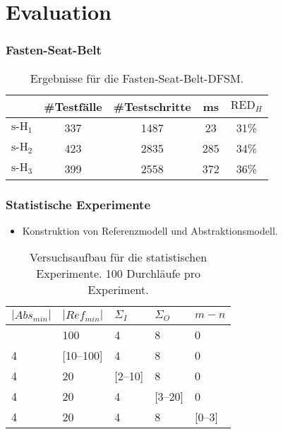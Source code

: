 \section{Evaluation}

\begin{frame}
  \frametitle{Fasten-Seat-Belt}
  \begin{table}[]
    \caption{Ergebnisse für die \glqq Fasten-Seat-Belt\grqq-DFSM.}
    \label{tab:fsbrtsx}
    \centering
    \begin{tabular}{|ccccc|}
    \hline
          & \#Testfälle & \#Testschritte & ms & $\text{RED}_H$\\ \hline\hline
        $\text{s-H}_1$ & 337         & 1487    &    23   &  31\% \\ \hline
    $\text{s-H}_2$ & 423         & 2835    &    285  & 34\%  \\ \hline
    $\text{s-H}_3$ & 399         & 2558    &    372   &  36\% \\ \hline
    \end{tabular}
\end{table}
\end{frame} 

\begin{frame}
  \frametitle{Statistische Experimente}
  \begin{itemize}
    \item Konstruktion von Referenzmodell und Abstraktionsmodell.
  \end{itemize}
  \begin{table}[]
    \centering
    \begin{tabular}{|l|l|l|l|l|}
    \hline
    \textbf{$|Abs_{min}|$} & \textbf{$|Ref_{min}|$} & \textbf{$\Sigma_I$}   & \textbf{$\Sigma_O$}  & \textbf{$m-n$}   \\ \hline
    [2--99]     & 100        & 4      & 8      & 0 \\ \hline
    4          & [10--100]   & 4      & 8      & 0 \\ \hline
    4          & 20         & [2--10] & 8      & 0 \\ \hline
    4          & 20         & 4      & [3--20] & 0 \\ \hline
    4          & 20         & 4      & 8      & [0--3] \\ \hline
    \end{tabular}
    \caption{Versuchsaufbau für die statistischen Experimente. 100 Durchläufe pro Experiment.}
\end{table}
\end{frame}

